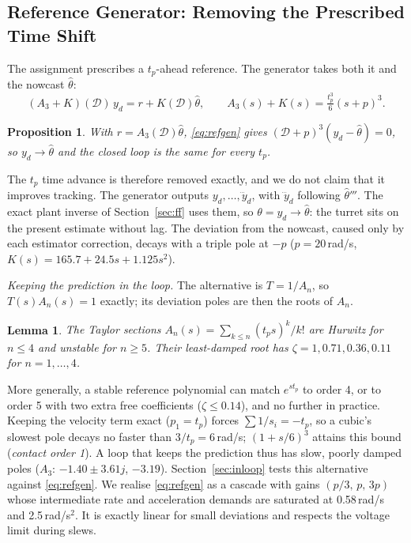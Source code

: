 \documentclass[conference]{IEEEtran}
\newcommand{\D}{\mathcal{D}}
\newtheorem{proposition}{Proposition}
\newtheorem{lemma}{Lemma}
\begin{document}
\subsection{Reference Generator: Removing the Prescribed Time Shift}
The assignment prescribes a $t_p$-ahead reference. The generator takes both it and the nowcast $\hat\theta$:
\begin{equation}
(A_3+K)(\D)\,y_d=r+K(\D)\hat\theta,\qquad A_3(s)+K(s)=\tfrac{t_p^3}{6}(s+p)^3 .
\label{eq:refgen}
\end{equation}
\begin{proposition}
With $r=A_3(\D)\hat\theta$, \eqref{eq:refgen} gives $(\D+p)^3(y_d-\hat\theta)=0$, so $y_d\to\hat\theta$ and the closed loop is the same for every $t_p$.
\end{proposition}
The $t_p$ time advance is therefore removed exactly, and we do not claim that it improves tracking. The generator outputs $y_d,\dots,\dddot y_d$, with $\dddot y_d$ following $\hat\theta'''$. The exact plant inverse of Section~\ref{sec:ff} uses them, so $\theta=y_d\to\hat\theta$: the turret sits on the present estimate without lag. The deviation from the nowcast, caused only by each estimator correction, decays with a triple pole at $-p$ ($p=20$\,rad/s, $K(s)=165.7+24.5s+1.125s^2$).

\emph{Keeping the prediction in the loop.} The alternative is $T=1/A_n$, so $T(s)A_n(s)=1$ exactly; its deviation poles are then the roots of $A_n$.
\begin{lemma}
The Taylor sections $A_n(s)=\sum_{k\le n}(t_ps)^k/k!$ are Hurwitz for $n\le4$ and unstable for $n\ge5$. Their least-damped root has $\zeta=1, 0.71, 0.36, 0.11$ for $n=1,\dots,4$.
\end{lemma}
More generally, a stable reference polynomial can match $e^{st_p}$ to order 4, or to order 5 with two extra free coefficients ($\zeta\le0.14$), and no further in practice. Keeping the velocity term exact ($p_1=t_p$) forces $\sum1/s_i=-t_p$, so a cubic's slowest pole decays no faster than $3/t_p=6$\,rad/s; $(1+s/6)^3$ attains this bound (\emph{contact order 1}). A loop that keeps the prediction thus has slow, poorly damped poles ($A_3$: $-1.40\pm3.61j$, $-3.19$). Section~\ref{sec:inloop} tests this alternative against \eqref{eq:refgen}. We realise \eqref{eq:refgen} as a cascade with gains $(p/3,\,p,\,3p)$ whose intermediate rate and acceleration demands are saturated at 0.58\,rad/s and 2.5\,rad/s$^2$. It is exactly linear for small deviations and respects the voltage limit during slews.
\end{document}
